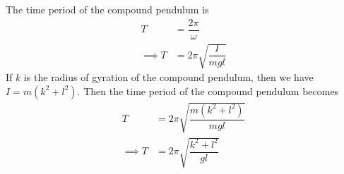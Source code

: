 \begin{enumerate}
	The time period of the compound pendulum is
	\begin{align*}
		T&=\dfrac{2\pi}{\omega} \\
		\implies T&=2\pi\sqrt{\dfrac{I}{mgl}}
	\end{align*}
	If $k$ is the radius of gyration of the compound pendulum, then we have $I=m(k^2+l^2)$. Then the time period of the compound pendulum becomes
	\begin{align*}
		T&=2\pi\sqrt{\dfrac{m(k^2+l^2)}{mgl}} \\
		\implies T&=2\pi\sqrt{\dfrac{k^2+l^2}{gl}}
	\end{align*}
\end{enumerate}